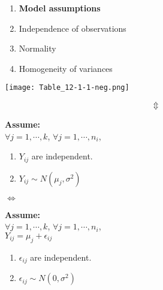 \begin{frame}
	\begin{minipage}{0.6\textwidth}
	\begin{enumerate}
		\item[] {\bf Model assumptions}
		\item Independence of observations
		\item Normality
		\item Homogeneity of variances
	\end{enumerate}
	\end{minipage}\pause
	\begin{minipage}{0.38\textwidth}
		\texttt{[image: Table\_12-1-1-neg.png]}
	\end{minipage}
\vfill

			\begin{minipage}{0.4\textwidth}
			\[\Updownarrow\]
			\end{minipage}
\vfill

	\begin{minipage}{0.4\textwidth}
		{\noindent\bf Assume:} \\
		$\forall j=1,\cdots, k$, $\forall j=1,\cdots, n_i$,
	\begin{enumerate}
		\item $Y_{ij}$ are independent.
		\item $Y_{ij}\sim N(\mu_j,\sigma^2)$
	\end{enumerate}
	\end{minipage}\pause
	\hfill $\Longleftrightarrow$ \hfill
	\begin{minipage}{0.45\textwidth}
		{\noindent\bf Assume:} \\
		$\forall j=1,\cdots, k$, $\forall j=1,\cdots, n_i$,\\
		\phantom{aaaaa} $Y_{ij} = \mu_j + \epsilon_{ij}$
	\begin{enumerate}
		\item $\epsilon_{ij}$ are independent.
		\item $\epsilon_{ij}\sim N(0,\sigma^2)$
	\end{enumerate}
	\end{minipage}
\end{frame}
